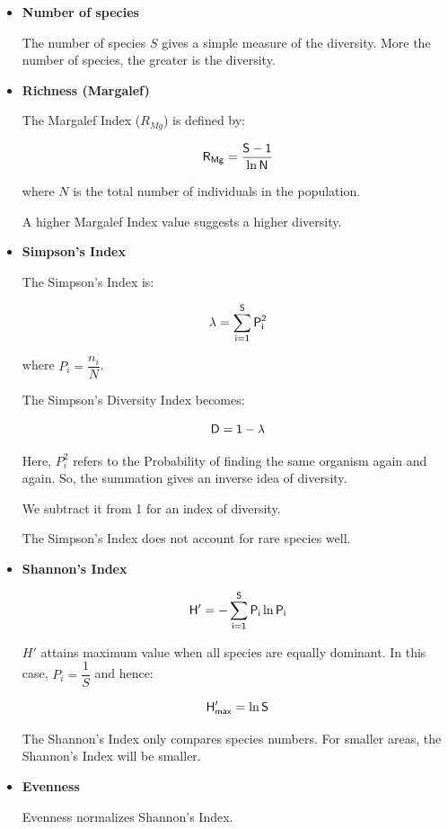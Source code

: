 \documentclass[twocolumn]{article}
\begin{document}
\begin{itemize}
    \item \textbf{Number of species}
    
    The number of species $S$ gives a simple measure of the diversity. More the number of species, the greater is the diversity.

    \item \textbf{Richness (Margalef)}
    
    The Margalef Index ($R_{Mg}$) is defined by:

    \[
        \sf R_{Mg} = \frac{S-1}{\ln N} 
    \]

    where $N$ is the total number of individuals in the population.

    A higher Margalef Index value suggests a higher diversity.

    \item \textbf{Simpson's Index}
    
    The Simpson's Index is:

    \[
        \sf \lambda = \sum_{i=1}^{S} P_i^2
    \]

    where $P_i = \dfrac{n_i}{N}$.

    The Simpson's Diversity Index becomes:

    \[ 
        \sf D = 1 - \lambda    
    \]

    Here, $P_i^2$ refers to the Probability of finding the same organism again and again. So, the summation gives an inverse idea of diversity.

    We subtract it from 1 for an index of diversity.

    The Simpson's Index does not account for rare species well.

    \item \textbf{Shannon's Index}
    
    \[ 
        \sf H' = -\sum_{i=1}^{S}P_i \ln P_i    
    \]

    $H'$ attains maximum value when all species are equally dominant. In this case, $P_i = \dfrac{1}{S}$ and hence:

    \[ 
        \sf H_{max}' = \ln S    
    \]

    The Shannon's Index only compares species numbers. For smaller areas, the Shannon's Index will be smaller. 

    \item \textbf{Evenness}
    
    Evenness normalizes Shannon's Index.


\end{itemize}
\end{document}
